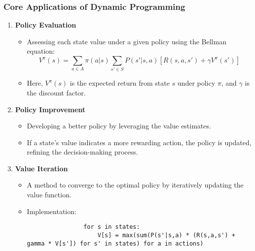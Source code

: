 \documentclass[aspectratio=169]{beamer}
\begin{document}
\begin{frame}[fragile]
    \frametitle{Core Applications of Dynamic Programming}
    \begin{enumerate}
        \item \textbf{Policy Evaluation}
            \begin{itemize}
                \item Assessing each state value under a given policy using the Bellman equation:
                \begin{equation}
                    V^\pi(s) = \sum_{a \in A} \pi(a|s) \sum_{s' \in S} P(s'|s,a)\left[R(s,a,s') + \gamma V^\pi(s')\right]
                \end{equation}
                \item Here, \( V^\pi(s) \) is the expected return from state \( s \) under policy \( \pi \), and \( \gamma \) is the discount factor.
            \end{itemize}

        \item \textbf{Policy Improvement}
            \begin{itemize}
                \item Developing a better policy by leveraging the value estimates.
                \item If a state’s value indicates a more rewarding action, the policy is updated, refining the decision-making process.
            \end{itemize}

        \item \textbf{Value Iteration}
            \begin{itemize}
                \item A method to converge to the optimal policy by iteratively updating the value function.
                \item Implementation:
                \begin{lstlisting}
                for s in states:
                    V[s] = max(sum(P(s'|s,a) * (R(s,a,s') + gamma * V[s']) for s' in states) for a in actions)
                \end{lstlisting}
            \end{itemize}
    \end{enumerate}
\end{frame}
\end{document}
